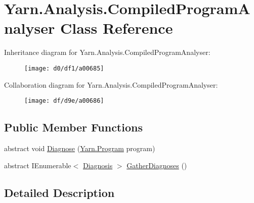 \hypertarget{a00033}{\section{Yarn.\-Analysis.\-Compiled\-Program\-Analyser Class Reference}
\label{a00033}
}


Inheritance diagram for Yarn.\-Analysis.\-Compiled\-Program\-Analyser\-:
\nopagebreak
\begin{figure}[H]
\begin{center}
\leavevmode
\texttt{[image: d0/df1/a00685]}
\end{center}
\end{figure}


Collaboration diagram for Yarn.\-Analysis.\-Compiled\-Program\-Analyser\-:
\nopagebreak
\begin{figure}[H]
\begin{center}
\leavevmode
\texttt{[image: df/d9e/a00686]}
\end{center}
\end{figure}
\subsection*{Public Member Functions}
\begin{DoxyCompactItemize}
\item 
abstract void \hyperlink{a00033_aba4a36cb823b11ee491074e26477d084}{Diagnose} (\hyperlink{a00126}{Yarn.\-Program} program)
\item 
abstract I\-Enumerable$<$ \hyperlink{a00071}{Diagnosis} $>$ \hyperlink{a00033_afe059a2ceeabe50380b000420e512bd6}{Gather\-Diagnoses} ()
\end{DoxyCompactItemize}


\subsection{Detailed Description}


